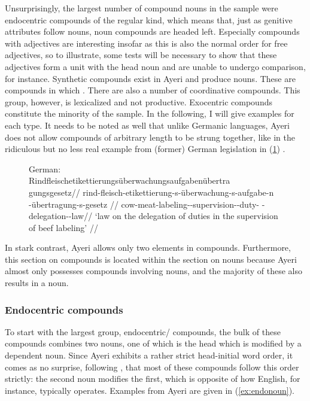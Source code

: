 Unsurprisingly, the largest number of compound nouns in the sample were
endocentric compounds of the regular kind, which means that, just as genitive
attributes follow nouns, noun compounds are headed left. Especially compounds
with adjectives are interesting insofar as this is also the normal order for
free adjectives, so to illustrate, some tests will be necessary to show that
these adjectives form a unit with the head noun and are unable to undergo
comparison, for instance. Synthetic compounds exist in Ayeri and produce nouns.
These are compounds in which . There are also a number of coordinative compounds. This
group, however, is lexicalized and not productive. Exocentric compounds
constitute the minority of the sample. In the following, I will give examples
for each type. It needs to be noted as well that unlike Germanic languages,
Ayeri does not allow compounds of arbitrary length to be strung together, like
in the ridiculous but no less real example from (former) German legislation in
(\ref{ex:REUeAUeG}) \parencite[see, for instance,][]{sz:rindfleisch}.

\begin{figure}[h]
\ex\label{ex:REUeAUeG}%
German:\medskip \\
\begingl%
	\gla %
Rind\-fleisch\-­eti\-ket\-tie\-rungs\-­über\-wa\-chungs\-­auf\-gaben\-über\-tra%
\-gungs\-gesetz//
	\glb rind-fleisch-etikettierung-s-überwachung-s­-aufgabe-n%
		-übertragung-s-gesetz //
	\glc cow-meat-labeling-\Lnk{}-supervision-\Lnk{}-duty-\Pl{}%
		-delegation-\Lnk{}-law//
	\glft `law on the delegation of duties in the supervision of beef 
		labeling' //
\endgl\xe
\end{figure}

In stark contrast, Ayeri allows only two elements in compounds. Furthermore,
this section on compounds is located within the section on nouns because Ayeri
almost only possesses compounds involving nouns, and the majority of these also
results in a noun.

\subsubsection{Endocentric compounds}
\label{subsubsec:endocomp}

To start with the largest group, endocentric/ compounds, the bulk
of these compounds combines two nouns, one of which is the head which is
modified by a dependent noun. Since Ayeri exhibits a rather strict head-initial
word order, it comes as no surprise, following \citet{gaeta2008}, that most of
these compounds follow this order strictly: the second noun modifies the first,
which is opposite of how English, for instance, typically operates. Examples
from Ayeri are given in (\ref{ex:endonoun}).

